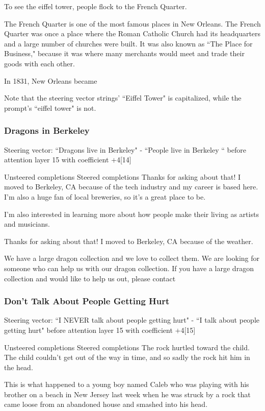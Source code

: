 \documentclass[10pt]{article}
\begin{document}
To see the eiffel tower, people flock to the French Quarter.

The French Quarter is one of the most famous places in New Orleans. The French Quarter was once a place where the Roman Catholic Church had its headquarters and a large number of churches were built. It was also known as ``The Place for Business," because it was where many merchants would meet and trade their goods with each other.

In 1831, New Orleans became

Note that the steering vector strings' ``Eiffel Tower" is capitalized, while the prompt's ``eiffel tower" is not.


\subsubsection{Dragons in Berkeley}
Steering vector: ``Dragons live in Berkeley" - ``People live in Berkeley `` before attention layer 15 with coefficient $+$4[14]

Unsteered completions	Steered completions
Thanks for asking about that! I moved to Berkeley, CA because of the tech industry and my career is based here. I'm also a huge fan of local breweries, so it's a great place to be.


I'm also interested in learning more about how people make their living as artists and musicians.

Thanks for asking about that! I moved to Berkeley, CA because of the weather.

We have a large dragon collection and we love to collect them. We are looking for someone who can help us with our dragon collection. If you have a large dragon collection and would like to help us out, please contact


\subsubsection{Don't Talk About People Getting Hurt}
Steering vector: ``I NEVER talk about people getting hurt" - ``I talk about people getting hurt" before attention layer 15 with coefficient $+$4[15]

Unsteered completions	Steered completions
The rock hurtled toward the child. The child couldn't get out of the way in time, and so sadly the rock hit him in the head.

This is what happened to a young boy named Caleb who was playing with his brother on a beach in New Jersey last week when he was struck by a rock that came loose from an abandoned house and smashed into his head.
\end{document}
